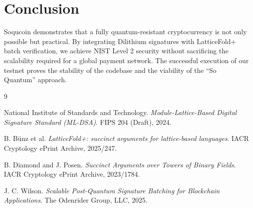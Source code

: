 \documentclass[10pt, twocolumn]{article}
\begin{document}
\section{Conclusion}
Soqucoin demonstrates that a fully quantum-resistant cryptocurrency is not only possible but practical. By integrating Dilithium signatures with LatticeFold+ batch verification, we achieve NIST Level 2 security without sacrificing the scalability required for a global payment network. The successful execution of our testnet proves the stability of the codebase and the viability of the ``So Quantum'' approach.

\begin{thebibliography}{9}

National Institute of Standards and Technology.
\textit{Module-Lattice-Based Digital Signature Standard (ML-DSA)}.
FIPS 204 (Draft), 2024.

B. B\"{u}nz et al.
\textit{LatticeFold+: succinct arguments for lattice-based languages}.
IACR Cryptology ePrint Archive, 2025/247.

B. Diamond and J. Posen.
\textit{Succinct Arguments over Towers of Binary Fields}.
IACR Cryptology ePrint Archive, 2023/1784.

J. C. Wilson.
\textit{Scalable Post-Quantum Signature Batching for Blockchain Applications}.
The Odenrider Group, LLC, 2025.

\end{thebibliography}
\end{document}
